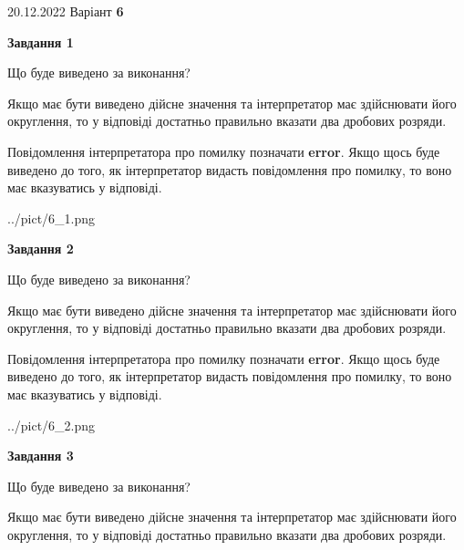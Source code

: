 \documentclass[12pt, ukrainian]{article}
\begin{document}
{20.12.2022 Варіант \No \textbf { 6 }\par}
{
\begin {Large}

{\begin {center}\textbf{Завдання 1}\end {center}}\par
Що буде виведено за виконання? \par

Якщо має бути виведено дійсне значення та інтерпретатор має здійснювати його округлення, 
то у відповіді достатньо правильно вказати два дробових розряди.

Повідомлення інтерпретатора про помилку позначати \textbf{error}.
Якщо щось буде виведено до того, як інтерпретатор видасть повідомлення про помилку, 
то воно має вказуватись у відповіді. \par

\begin{center}
	{../pict/6_1.png}
\end{center}
\newpage

{\begin {center}\textbf{Завдання 2}\end {center}}\par
Що буде виведено за виконання? \par

Якщо має бути виведено дійсне значення та інтерпретатор має здійснювати його округлення, 
то у відповіді достатньо правильно вказати два дробових розряди.

Повідомлення інтерпретатора про помилку позначати \textbf{error}.
Якщо щось буде виведено до того, як інтерпретатор видасть повідомлення про помилку, 
то воно має вказуватись у відповіді. \par

\begin{center}
	{../pict/6_2.png}
\end{center}
\newpage

{\begin {center}\textbf{Завдання 3}\end {center}}\par
Що буде виведено за виконання? \par

Якщо має бути виведено дійсне значення та інтерпретатор має здійснювати його округлення, 
то у відповіді достатньо правильно вказати два дробових розряди.


\end{Large}}
\end{document}
